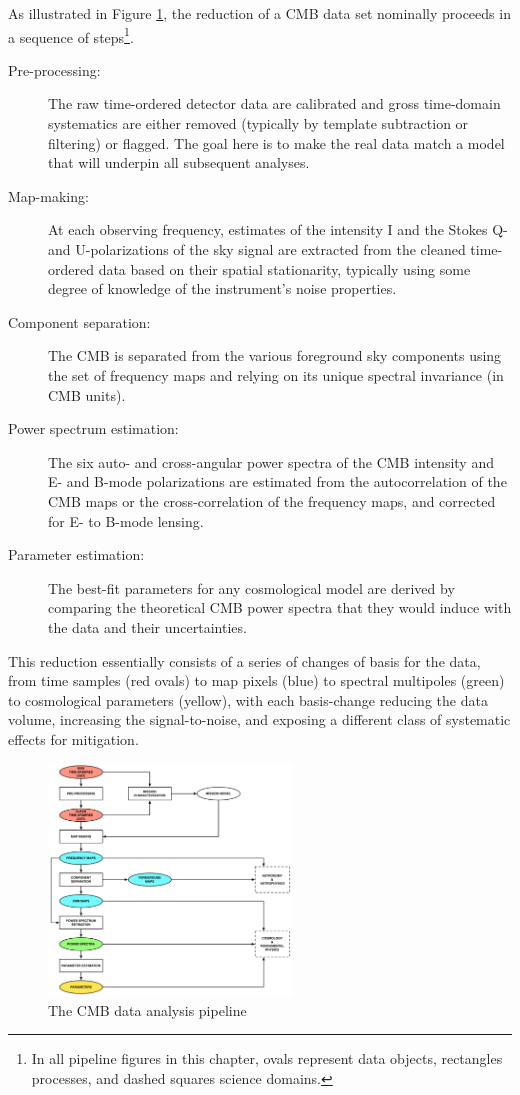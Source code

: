 As illustrated in Figure \ref{fig_da}, the reduction of a CMB data set nominally proceeds in a sequence of steps\footnote{In all pipeline figures in this chapter, ovals represent data objects, rectangles processes, and dashed squares science domains.}.
\begin{description}
\item[ Pre-processing:] The raw time-ordered detector data are calibrated and gross time-domain systematics are either removed (typically by template subtraction or filtering) or flagged. The goal here is to make the real data match a model that will underpin all subsequent analyses.
\item[Map-making:] At each observing frequency, estimates of the intensity I and the Stokes Q- and U-polarizations of the sky signal are extracted from the cleaned time-ordered data based on their spatial stationarity, typically using some degree of knowledge of the instrument's noise properties.
\item[Component separation:] The CMB is separated from the various foreground sky components using the set of frequency maps and relying on its unique spectral invariance (in CMB units).
\item[Power spectrum estimation:] The six auto- and cross-angular power spectra of the CMB intensity and E- and B-mode polarizations are estimated from the autocorrelation of the CMB maps or the cross-correlation of the frequency maps, and corrected for E- to B-mode lensing.
\item[Parameter estimation:] The best-fit parameters for any cosmological model are derived by comparing the theoretical CMB power spectra that they would induce with the data and their uncertainties.
\end{description}
This reduction essentially consists of a series of changes of basis for the data, from time samples (red ovals) to map pixels (blue) to spectral multipoles (green) to cosmological parameters (yellow), with each basis-change reducing the data volume, increasing the signal-to-noise, and exposing a different class of systematic effects for mitigation.

\begin{figure}[htbp]
\centering
\includegraphics[width=0.575\textwidth]{Analysis/da}
\caption{The CMB data analysis pipeline}
\label{fig_da}
\end{figure}

